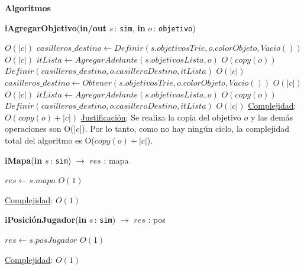 \documentclass[a4paper,10pt]{article}
\let\TipoVariable=\texttt
\let\ModificadorArgumento=\textbf
\newcommand{\In}[2]{\ModificadorArgumento{in} \ensuremath{#1}\,: \TipoVariable{#2}\xspace}
\newcommand{\Inout}[2]{\ModificadorArgumento{in/out} \ensuremath{#1}\,: \TipoVariable{#2}\xspace}
\newenvironment{Algoritmos}{%
  \vspace*{2ex}%
  \noindent\textbf{\Large Algoritmos}%
  \vspace*{2ex}%
}{}
\begin{document}
\begin{Algoritmos}
\begin{algorithm}[H]{\textbf{iAgregarObjetivo}(\Inout{s}{sim}, \In{o}{objetivo})}
      \begin{algorithmic}[1]
                                               \Comment $O(|c|)$
            \State $casilleros\_destino \gets Definir(s.objetivosTrie, o.colorObjeto, Vacio())$     \Comment $O(|c|)$
            \State $itLista \gets AgregarAdelante(s.objetivosLista, o)$                             \Comment $O(copy(o))$
            \State $Definir(casilleros\_destino, o.casilleroDestino, itLista)$                      \Comment $O(|c|)$
        \Else
            \State $casilleros\_destino \gets Obtener(s.objetivosTrie, o.colorObjeto, Vacio())$     \Comment $O(|c|)$
                                    \Comment $O(|c|)$
                \State $itLista \gets AgregarAdelante(s.objetivosLista, o)$                         \Comment $O(copy(o))$
                \State $Definir(casilleros\_destino, o.casilleroDestino, itLista)$                  \Comment $O(|c|)$
            \EndIf
        \EndIf
      \medskip
      \Statex \underline{Complejidad}:  $O(copy(o)+|c|)$
      \Statex \underline{Justificación}: Se realiza la copia del objetivo $o$ y las demás operaciones son O(|$c$|). Por lo tanto, como no hay ningún ciclo, la complejidad total del algoritmo es O($copy(o) + |c|$).
      \end{algorithmic}
\end{algorithm} 

\begin{algorithm}[H]{\textbf{iMapa}(\In{s}{sim}) $\to$ $res$ : mapa}
      \begin{algorithmic}[1]
       \State $res \gets s.mapa$   \Comment $O(1)$
       
      \medskip
      \Statex \underline{Complejidad}: $O(1)$
      \end{algorithmic}
\end{algorithm} 

\begin{algorithm}[H]{\textbf{iPosiciónJugador}(\In{s}{sim}) $\to$ $res$ : pos}
      \begin{algorithmic}[1]
       \State $res \gets s.posJugador$   \Comment $O(1)$
       
      \medskip
      \Statex \underline{Complejidad}: $O(1)$
      \end{algorithmic}
\end{algorithm} 


\end{Algoritmos}
\end{document}
